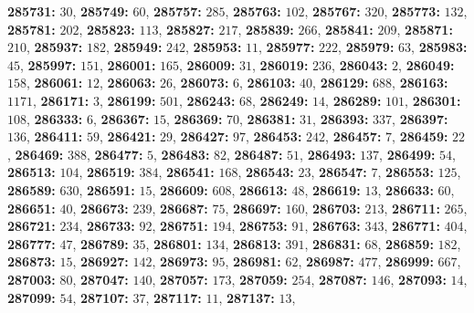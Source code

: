 \textsf{\bfseries 285731:} $30$, \textsf{\bfseries 285749:} $60$, \textsf{\bfseries 285757:} $285$, \textsf{\bfseries 285763:} $102$, \textsf{\bfseries 285767:} $320$, \textsf{\bfseries 285773:} $132$, \textsf{\bfseries 285781:} $202$, \textsf{\bfseries 285823:} $113$, \textsf{\bfseries 285827:} $217$, \textsf{\bfseries 285839:} $266$, \textsf{\bfseries 285841:} $209$, \textsf{\bfseries 285871:} $210$, \textsf{\bfseries 285937:} $182$, \textsf{\bfseries 285949:} $242$, \textsf{\bfseries 285953:} $11$, \textsf{\bfseries 285977:} $222$, \textsf{\bfseries 285979:} $63$, \textsf{\bfseries 285983:} $45$, \textsf{\bfseries 285997:} $151$, \textsf{\bfseries 286001:} $165$, \textsf{\bfseries 286009:} $31$, \textsf{\bfseries 286019:} $236$, \textsf{\bfseries 286043:} $2$, \textsf{\bfseries 286049:} $158$, \textsf{\bfseries 286061:} $12$, \textsf{\bfseries 286063:} $26$, \textsf{\bfseries 286073:} $6$, \textsf{\bfseries 286103:} $40$, \textsf{\bfseries 286129:} $688$, \textsf{\bfseries 286163:} $1171$, \textsf{\bfseries 286171:} $3$, \textsf{\bfseries 286199:} $501$, \textsf{\bfseries 286243:} $68$, \textsf{\bfseries 286249:} $14$, \textsf{\bfseries 286289:} $101$, \textsf{\bfseries 286301:} $108$, \textsf{\bfseries 286333:} $6$, \textsf{\bfseries 286367:} $15$, \textsf{\bfseries 286369:} $70$, \textsf{\bfseries 286381:} $31$, \textsf{\bfseries 286393:} $337$, \textsf{\bfseries 286397:} $136$, \textsf{\bfseries 286411:} $59$, \textsf{\bfseries 286421:} $29$, \textsf{\bfseries 286427:} $97$, \textsf{\bfseries 286453:} $242$, \textsf{\bfseries 286457:} $7$, \textsf{\bfseries 286459:} $22$, \textsf{\bfseries 286469:} $388$, \textsf{\bfseries 286477:} $5$, \textsf{\bfseries 286483:} $82$, \textsf{\bfseries 286487:} $51$, \textsf{\bfseries 286493:} $137$, \textsf{\bfseries 286499:} $54$, \textsf{\bfseries 286513:} $104$, \textsf{\bfseries 286519:} $384$, \textsf{\bfseries 286541:} $168$, \textsf{\bfseries 286543:} $23$, \textsf{\bfseries 286547:} $7$, \textsf{\bfseries 286553:} $125$, \textsf{\bfseries 286589:} $630$, \textsf{\bfseries 286591:} $15$, \textsf{\bfseries 286609:} $608$, \textsf{\bfseries 286613:} $48$, \textsf{\bfseries 286619:} $13$, \textsf{\bfseries 286633:} $60$, \textsf{\bfseries 286651:} $40$, \textsf{\bfseries 286673:} $239$, \textsf{\bfseries 286687:} $75$, \textsf{\bfseries 286697:} $160$, \textsf{\bfseries 286703:} $213$, \textsf{\bfseries 286711:} $265$, \textsf{\bfseries 286721:} $234$, \textsf{\bfseries 286733:} $92$, \textsf{\bfseries 286751:} $194$, \textsf{\bfseries 286753:} $91$, \textsf{\bfseries 286763:} $343$, \textsf{\bfseries 286771:} $404$, \textsf{\bfseries 286777:} $47$, \textsf{\bfseries 286789:} $35$, \textsf{\bfseries 286801:} $134$, \textsf{\bfseries 286813:} $391$, \textsf{\bfseries 286831:} $68$, \textsf{\bfseries 286859:} $182$, \textsf{\bfseries 286873:} $15$, \textsf{\bfseries 286927:} $142$, \textsf{\bfseries 286973:} $95$, \textsf{\bfseries 286981:} $62$, \textsf{\bfseries 286987:} $477$, \textsf{\bfseries 286999:} $667$, \textsf{\bfseries 287003:} $80$, \textsf{\bfseries 287047:} $140$, \textsf{\bfseries 287057:} $173$, \textsf{\bfseries 287059:} $254$, \textsf{\bfseries 287087:} $146$, \textsf{\bfseries 287093:} $14$, \textsf{\bfseries 287099:} $54$, \textsf{\bfseries 287107:} $37$, \textsf{\bfseries 287117:} $11$, \textsf{\bfseries 287137:} $13$, 
